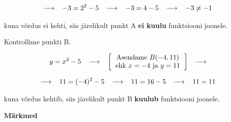 \begin{center}
{{{\begin{flushleft}
\[ \longrightarrow \hspace{3mm} -3 = 2^{2}-5 \hspace{3mm} \longrightarrow \hspace{3mm} -3 = 4 -5 \hspace{3mm} \longrightarrow \hspace{3mm} -3 \neq -1 \]

\hspace{5mm}
kuna võrdus ei kehti, siis järelikult punkt A \textbf{ei kuulu} funktsiooni joonele.

\vspace{2mm}
\hspace{5mm}
Kontrollime punkti B.

\[ y=x^{2}-5 \hspace{3mm} \longrightarrow \hspace{3mm} \left[ \begin{tabular}{c}
Asendame $B(-4, 11)$\\
ehk $x=-4$ ja $y=11$
\end{tabular} \right] \hspace{3mm} \longrightarrow  \]

\[ \longrightarrow \hspace{3mm} 11 = (-4)^{2}-5 \hspace{3mm} \longrightarrow \hspace{3mm} 11 = 16 -5 \hspace{3mm} \longrightarrow \hspace{3mm} 11 = 11 \]

\hspace{5mm}
kuna võrdus kehtib, siis järelikult punkt B \textbf{kuulub} funktsiooni joonele.
\end{flushleft}
}}}
\end{center}



\vspace{0.5cm}

\textbf{Märkmed}\\
\vspace{2mm}
\begin{mdframed}[style=graphpaper]
\vspace{6cm}
\end{mdframed}
